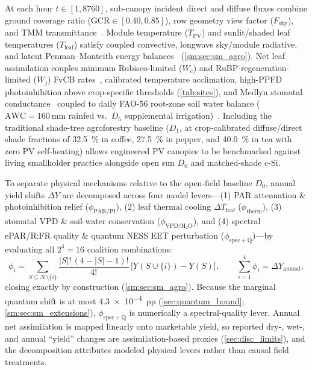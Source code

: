 \documentclass[preprint,12pt,a4paper]{elsarticle}
\begin{document}
At each hour $t \in [\num{1}, \num{8760}]$, sub-canopy incident direct and diffuse fluxes combine ground coverage ratio ($\mathrm{GCR}\in [\num{0.40}, \num{0.85}]$), row geometry view factor ($F_{\mathrm{sky}}$), and TMM transmittance~\cite{MaLu2022,Zainali2025}. Module temperature ($T_{\mathrm{PV}}$) and sunlit/shaded leaf temperatures ($T_{\mathrm{leaf}}$) satisfy coupled convective, longwave sky/module radiative, and latent Penman--Monteith energy balances~\cite{Allen1998,Marrou2013} (\cref{sm:sec:sm_agro}). Net leaf assimilation couples minimum Rubisco-limited ($W_c$) and RuBP-regeneration-limited ($W_j$) FvCB rates~\cite{Farquhar1980}, calibrated temperature acclimation, high-PPFD photoinhibition above crop-specific thresholds (\cref{tab:sites}), and Medlyn stomatal conductance~\cite{Medlyn2011} coupled to daily FAO-56 root-zone soil water balance ($\mathrm{AWC}=\qty{160}{\milli\meter}$ rainfed vs.\ $D_5$ supplemental irrigation)~\cite{Elamri2018}. Including the traditional shade-tree agroforestry baseline ($D_1$, at crop-calibrated diffuse/direct shade fractions of \qty{32.5}{\percent} in coffee, \qty{27.5}{\percent} in pepper, and \qty{40.0}{\percent} in tea with zero PV self-heating) allows engineered PV canopies to be benchmarked against living smallholder practice alongside open sun $D_0$ and matched-shade c-Si.

To separate physical mechanisms relative to the open-field baseline $D_0$, annual yield shifts $\Delta Y$ are decomposed across four model levers---(1) PAR attenuation \& photoinhibition relief ($\phi_{\mathrm{PAR/PI}}$), (2) leaf thermal cooling $\Delta T_{\mathrm{leaf}}$ ($\phi_{\mathrm{therm}}$), (3) stomatal VPD \& soil-water conservation ($\phi_{\mathrm{VPD/H_2O}}$), and (4) spectral ePAR/R:FR quality \& quantum NESS EET perturbation ($\phi_{\mathrm{spec+Q}}$)---by evaluating all $2^4 = \num{16}$ coalition combinations:
\begin{equation}
 \phi_i = \sum_{S \subseteq \mathcal{N}\setminus \{i\}} \frac{|S|!\,(4-|S|-1)!}{4!}\,\Big[Y(S\cup\{i\}) - Y(S)\Big], \qquad \sum_{i=1}^4 \phi_i = \Delta Y_{\mathrm{annual}},
 \label{eq:shapley}
\end{equation}
closing exactly by construction (\cref{sm:sec:sm_agro}). Because the marginal quantum shift is at most \qty{4.3e-4}{pp} (\cref{sec:quantum_bound}; \cref{sm:sec:sm_extensions}), $\phi_{\mathrm{spec+Q}}$ is numerically a spectral-quality lever. Annual net assimilation is mapped linearly onto marketable yield, so reported dry-, wet-, and annual ``yield'' changes are assimilation-based proxies (\cref{sec:disc_limits}), and the decomposition attributes modeled physical levers rather than causal field treatments.
\end{document}
